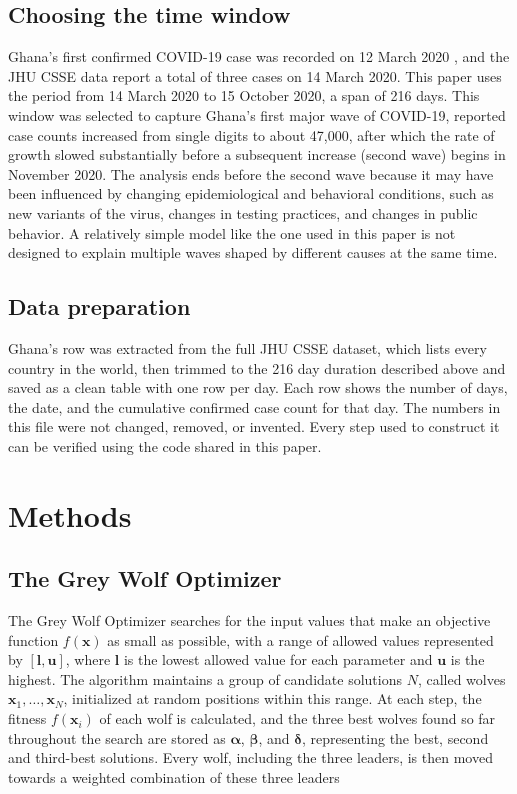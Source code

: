\documentclass[journal]{IEEEtran}
\begin{document}
\subsection{Choosing the time window}

Ghana's first confirmed COVID-19 case was recorded on 12 March 2020 \cite{kenu2020}, and the JHU CSSE data report a total of three cases on 14 March 2020. This paper uses the period from 14 March 2020 to 15 October 2020, a span of 216 days. This window was selected to capture Ghana's first major wave of COVID-19, reported case counts increased from single digits to about 47,000, after which the rate of growth slowed substantially before a subsequent increase (second wave) begins in November 2020. The analysis ends before the second wave because it may have been influenced by changing epidemiological and behavioral conditions, such as new variants of the virus, changes in testing practices, and changes in public behavior. A relatively simple model like the one used in this paper is not designed to explain multiple waves shaped by different causes at the same time.

\subsection{Data preparation}

Ghana's row was extracted from the full JHU CSSE dataset, which lists every country in the world, then trimmed to the 216 day duration described above and saved as a clean table with one row per day. Each row shows the number of days, the date, and the cumulative confirmed case count for that day. The numbers in this file were not changed, removed, or invented. Every step used to construct it can be verified using the code shared in this paper.

\section{Methods}

\subsection{The Grey Wolf Optimizer}

The Grey Wolf Optimizer searches for the input values that make an objective function $f(\mathbf{x})$ as small as possible, with a range of allowed values represented by $[\mathbf{l}, \mathbf{u}]$, where $\mathbf{l}$ is the lowest allowed value for each parameter and $\mathbf{u}$ is the highest. The algorithm maintains a group of candidate solutions $N$, called wolves $\mathbf{x}_1, \ldots, \mathbf{x}_N$, initialized at random positions within this range. At each step, the fitness $f(\mathbf{x}_i)$ of each wolf is calculated, and the three best wolves found so far throughout the search are stored as $\boldsymbol{\alpha}$, $\boldsymbol{\beta}$, and $\boldsymbol{\delta}$, representing the best, second and third-best solutions. Every wolf, including the three leaders, is then moved towards a weighted combination of these three leaders
\end{document}
